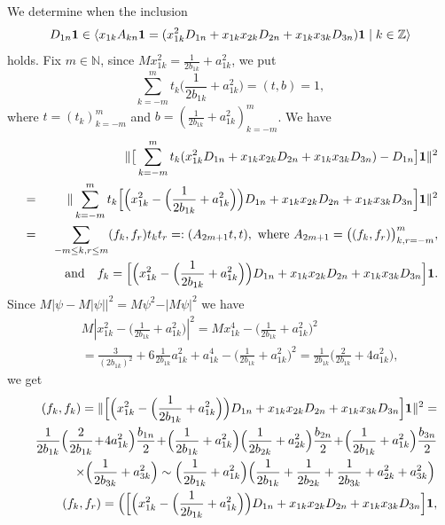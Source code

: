 \documentclass[preprint,12pt]{elsarticle}
\numberwithin{equation}{section}
\begin{document}
\begin{pf} 
We determine  when the inclusion
$$
D_{1n}{\bf 1}\in\langle x_{1k}A_{kn}{\bf
1}=(x^2_{1k}D_{1n}+x_{1k}x_{2k}D_{2n}+x_{1k}x_{3k}D_{3n}){\bf 1}\mid k\in {\mathbb Z}\rangle
$$
holds. Fix $m\in {\mathbb N}$, since $Mx^2_{1k}=\frac{1}{2b_{1k}}+a^2_{1k}$, we put 
$$
\sum_{k=-m}^mt_k\big(\frac{1}{2b_{1k}}+a^2_{1k}\big)=(t,b)=1,
$$
where $t=(t_k)_{k=-m}^m$ and $b=(\frac{1}{2b_{1k}}+a^2_{1k})_{k=-m}^m$. We have
\begin{eqnarray*}
 &&
\Vert \big[\sum_{k=-m}^mt_k(x^2_{1k}D_{1n}+x_{1k}x_{2k}D_{2n}+x_{1k}x_{3k}D_{3n})-D_{1n}\big]{\bf
1}\Vert^2\\
&=&
\Vert 
\sum_{k=-m}^mt_k\Big[\Big(x^2_{1k}-\Big(\frac{1}{2b_{1k}}+a^2_{1k}\Big)\Big)D_{1n}+x_{1k}x_{2k}D_{2n}+x_{1k}x_{3k}D_{3n}\Big]{\bf1}
\Vert^2
\\
&=&\sum_{-m\leq k,r\leq m}(f_k,f_r)t_kt_r=:(A_{2m+1}t,t),\,\,\text{where}\,\, A_{2m+1}=\big((f_k,f_r)\big)_{k,r=-m}^m,\\
&&\quad\text{ and}\quad
f_k=\Big[\Big(x^2_{1k}-\Big(\frac{1}{2b_{1k}}+a^2_{1k}\Big)\Big)D_{1n}+x_{1k}x_{2k}D_{2n}+x_{1k}x_{3k}D_{3n}\Big]{\bf 1}.
\end{eqnarray*}  
Since $M\vert \psi-M\vert \psi\vert\vert^2=M \psi^2-\vert M \psi\vert^2$ we have
\begin{eqnarray*}
&& 
M\left|x^2_{1k}-\Big(\frac{1}{2b_{1k}}+a^2_{1k}\Big)\right|^2=M x^4_{1k}-\Big(\frac{1}{2b_{1k}}+a^2_{1k}\Big)^2\\
&&=\frac{3}{(2b_{1k})^2}+6\frac{1}{2b_{1k}}a_{1k}^2+a^4_{1k}-\Big(\frac{1}{2b_{1k}}+a^2_{1k}\Big)^2
=\frac{1}{2b_{1k}}\Big(\frac{2}{2b_{1k}}+4a^2_{1k}\Big),
\end{eqnarray*}
we get
\begin{eqnarray*}
&&(f_k,f_k)=\Vert\Big[\Big(x^2_{1k}-\Big(\frac{1}{2b_{1k}}+a^2_{1k}\Big)\Big)D_{1n}+x_{1k}x_{2k}D_{2n}+x_{1k}x_{3k}D_{3n}\Big]{\bf1}\Vert^2=\\
&&\frac{1}{2b_{1k}}\Big(\frac{2}{2b_{1k}}\!+\!4a^2_{1k}\Big)\frac{b_{1n}}{2}\!+\!\Big(\frac{1}{2b_{1k}}+a_{1k}^2\Big)
\Big(\frac{1}{2b_{2k}}+a_{2k}^2\Big)
\frac{b_{2n}}{2}\!+\!\Big(\frac{1}{2b_{1k}}+a_{1k}^2\Big)
\frac{b_{3n}}{2} \\
&&\times\Big(\frac{1}{2b_{3k}}+a_{3k}^2\Big)\sim
\Big(\frac{1}{2b_{1k}}+a_{1k}^2\Big)\Big(\frac{1}{2b_{1k}}+\frac{1}{2b_{2k}}+\frac{1}{2b_{3k}}+a_{2k}^2+a_{3k}^2\Big)\,\\
&&(f_k,f_r)=\Big(\Big[\Big(x^2_{1k}-\Big(\frac{1}{2b_{1k}}+a^2_{1k}\Big)\Big)D_{1n}+x_{1k}x_{2k}D_{2n}+x_{1k}x_{3k}D_{3n}\Big]{\bf 1},\\

\end{eqnarray*}
\end{pf}
\end{document}
